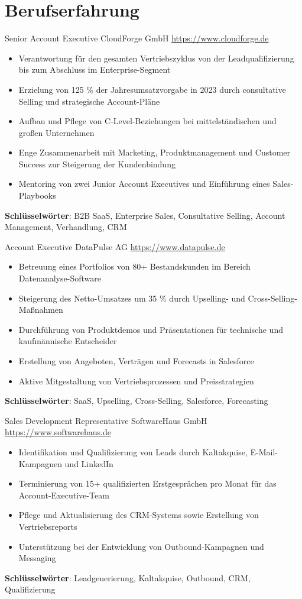 \documentclass[a4paper, serif, 10pt]{moderncv}
\begin{document}
\section{Berufserfahrung}

        {Senior Account Executive}
        {CloudForge GmbH}
        {\url{https://www.cloudforge.de}}
        {}
        {\begin{itemize}
\item Verantwortung für den gesamten Vertriebszyklus von der Leadqualifizierung bis zum Abschluss im Enterprise-Segment
\item Erzielung von 125 \% der Jahresumsatzvorgabe in 2023 durch consultative Selling und strategische Account-Pläne
\item Aufbau und Pflege von C-Level-Beziehungen bei mittelständischen und großen Unternehmen
\item Enge Zusammenarbeit mit Marketing, Produktmanagement und Customer Success zur Steigerung der Kundenbindung
\item Mentoring von zwei Junior Account Executives und Einführung eines Sales-Playbooks
\end{itemize}
\textbf{Schlüsselwörter}: B2B SaaS, Enterprise Sales, Consultative Selling, Account Management, Verhandlung, CRM}

        {Account Executive}
        {DataPulse AG}
        {\url{https://www.datapulse.de}}
        {}
        {\begin{itemize}
\item Betreuung eines Portfolios von 80+ Bestandskunden im Bereich Datenanalyse-Software
\item Steigerung des Netto-Umsatzes um 35 \% durch Upselling- und Cross-Selling-Maßnahmen
\item Durchführung von Produktdemos und Präsentationen für technische und kaufmännische Entscheider
\item Erstellung von Angeboten, Verträgen und Forecasts in Salesforce
\item Aktive Mitgestaltung von Vertriebsprozessen und Preisstrategien
\end{itemize}
\textbf{Schlüsselwörter}: SaaS, Upselling, Cross-Selling, Salesforce, Forecasting}

        {Sales Development Representative}
        {SoftwareHaus GmbH}
        {\url{https://www.softwarehaus.de}}
        {}
        {\begin{itemize}
\item Identifikation und Qualifizierung von Leads durch Kaltakquise, E-Mail-Kampagnen und LinkedIn
\item Terminierung von 15+ qualifizierten Erstgesprächen pro Monat für das Account-Executive-Team
\item Pflege und Aktualisierung des CRM-Systems sowie Erstellung von Vertriebsreports
\item Unterstützung bei der Entwicklung von Outbound-Kampagnen und Messaging
\end{itemize}
\textbf{Schlüsselwörter}: Leadgenerierung, Kaltakquise, Outbound, CRM, Qualifizierung}
\end{document}
